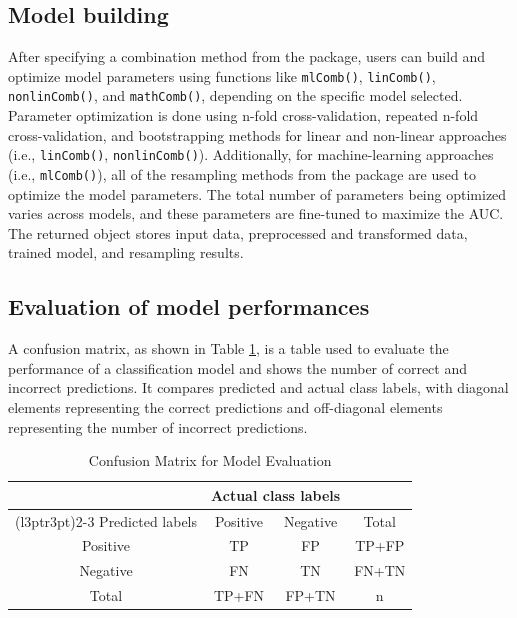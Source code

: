 \subsection{Model building}\label{model-building}

After specifying a combination method from the  package, users can build and optimize model parameters using functions like \texttt{mlComb()}, \texttt{linComb()}, \texttt{nonlinComb()}, and \texttt{mathComb()}, depending on the specific model selected. Parameter optimization is done using n-fold cross-validation, repeated n-fold cross-validation, and bootstrapping methods for linear and non-linear approaches (i.e., \texttt{linComb()}, \texttt{nonlinComb()}). Additionally, for machine-learning approaches (i.e., \texttt{mlComb()}), all of the resampling methods from the  package are used to optimize the model parameters. The total number of parameters being optimized varies across models, and these parameters are fine-tuned to maximize the AUC. The returned object stores input data, preprocessed and transformed data, trained model, and resampling results.

\subsection{Evaluation of model performances}\label{evaluation-of-model-performances}

A confusion matrix, as shown in Table \ref{tab:confusion-matrix}, is a table used to evaluate the performance of a classification model and shows the number of correct and incorrect predictions. It compares predicted and actual class labels, with diagonal elements representing the correct predictions and off-diagonal elements representing the number of incorrect predictions.

\begin{table}[!h]
\centering
\caption{\label{tab:confusion-matrix}Confusion Matrix for Model Evaluation}
\centering
\begin{tabular}[t]{cccc}
\toprule
\multicolumn{1}{c}{ } & \multicolumn{2}{c}{Actual class labels} & \multicolumn{1}{c}{ } \\
\cmidrule(l{3pt}r{3pt}){2-3}
Predicted labels & Positive & Negative & Total\\
\midrule
Positive & TP & FP & TP+FP\\
Negative & FN & TN & FN+TN\\
Total & TP+FN & FP+TN & n\\
\bottomrule
\end{tabular}
\end{table}

